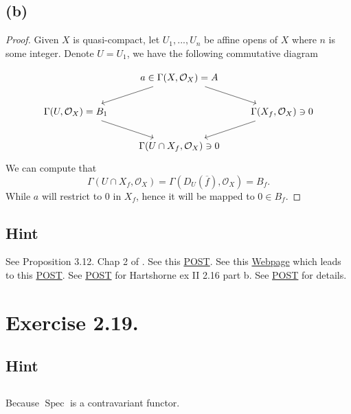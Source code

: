 \subsection{(b)}

\begin{proof}
    Given $X$ is quasi-compact, let $U_1,...,U_n$ be affine opens of $X$ where $n$ is some integer. Denote $U=U_1$, we have the following commutative diagram 

\[\begin{tikzcd}
	& {a\in\Gamma(X,\mathcal O_X)=A} \\
	{\Gamma(U,\mathcal O_X)=B_1} && {\Gamma(X_f,\mathcal O_X)\ni 0} \\
	& {\Gamma(U\cap X_f,\mathcal O_X)\ni 0}
	\arrow[from=1-2, to=2-1]
	\arrow[from=1-2, to=2-3]
	\arrow[from=2-1, to=3-2]
	\arrow[from=2-3, to=3-2]
\end{tikzcd}\]
    We can compute that 
    \[\Gamma(U\cap X_f,\mathcal O_X)=\Gamma(D_U(\overline f),\mathcal O_X)=B_f.\]
    While $a$ will restrict to $0$ in $X_f$, hence it will be mapped to $0\in B_f$.

\end{proof}

\subsection{Hint}


See Proposition 3.12. Chap 2 of \cite{qing2006algebraic}. See this \href{https://math.stackexchange.com/questions/2815859/hartshorne-algebraic-geometry-exercise-ii-2-16}{POST}. See this \href{https://math.berkeley.edu/~cjdowd/hartshorne.html}{Webpage} which leads to this \href{https://math.stackexchange.com/questions/57077/on-affine-local-properties}{POST}. See \href{https://math.stackexchange.com/questions/4686052/hartshorne-ex-ii-2-16-part-b}{POST} for Hartshorne ex II 2.16 part b. See \href{https://math.stackexchange.com/questions/2407252/help-doing-an-exercise-on-a-criterion-for-affiness-from-hartshorne}{POST} for details.

\section{Exercise 2.19.}

\subsection{Hint}



\subsection{}

Because $\operatorname{Spec}$ is a contravariant functor.